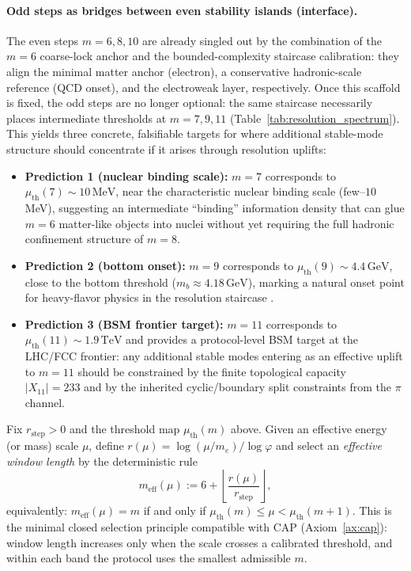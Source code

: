 \paragraph{Odd steps as bridges between even stability islands (interface).}
The even steps $m=6,8,10$ are already singled out by the combination of the $m=6$ coarse-lock anchor and the bounded-complexity staircase calibration: they align the minimal matter anchor (electron), a conservative hadronic-scale reference (QCD onset), and the electroweak layer, respectively.
Once this scaffold is fixed, the odd steps are no longer optional: the same staircase necessarily places intermediate thresholds at $m=7,9,11$ (Table~\ref{tab:resolution_spectrum}).
This yields three concrete, falsifiable targets for where additional stable-mode structure should concentrate if it arises through resolution uplifts:
\begin{itemize}
\item \textbf{Prediction 1 (nuclear binding scale):} $m=7$ corresponds to $\mu_{\mathrm{th}}(7)\sim 10\,\mathrm{MeV}$, near the characteristic nuclear binding scale (few--$10$ MeV), suggesting an intermediate ``binding'' information density that can glue $m=6$ matter-like objects into nuclei without yet requiring the full hadronic confinement structure of $m=8$.
\item \textbf{Prediction 2 (bottom onset):} $m=9$ corresponds to $\mu_{\mathrm{th}}(9)\sim 4.4\,\mathrm{GeV}$, close to the bottom threshold ($m_b\approx 4.18\,\mathrm{GeV}$), marking a natural onset point for heavy-flavor physics in the resolution staircase \cite{PDGRPP2024}.
\item \textbf{Prediction 3 (BSM frontier target):} $m=11$ corresponds to $\mu_{\mathrm{th}}(11)\sim 1.9\,\mathrm{TeV}$ and provides a protocol-level BSM target at the LHC/FCC frontier: any additional stable modes entering as an effective uplift to $m=11$ should be constrained by the finite topological capacity $|X_{11}|=233$ and by the inherited cyclic/boundary split constraints from the $\pi$ channel.
\end{itemize}

\begin{corollary}\label{ax:resolution_selection}
Fix $r_{\mathrm{step}}>0$ and the threshold map $\mu_{\mathrm{th}}(m)$ above.
Given an effective energy (or mass) scale $\mu$, define $r(\mu)=\log(\mu/m_e)/\log\varphi$ and select an \emph{effective window length} by the deterministic rule
\[
m_{\mathrm{eff}}(\mu):=6+\left\lfloor \frac{r(\mu)}{r_{\mathrm{step}}}\right\rfloor,
\]
equivalently: $m_{\mathrm{eff}}(\mu)=m$ if and only if $\mu_{\mathrm{th}}(m)\le \mu < \mu_{\mathrm{th}}(m+1)$.
This is the minimal closed selection principle compatible with CAP (Axiom~\ref{ax:cap}): window length increases only when the scale crosses a calibrated threshold, and within each band the protocol uses the smallest admissible $m$.
\end{corollary}

